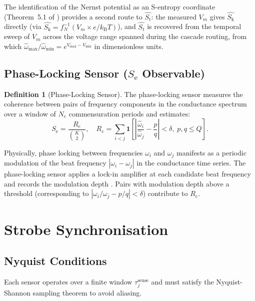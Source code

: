 \documentclass[11pt,twocolumn,a4paper]{article}
\theoremstyle{definition}
\newtheorem{definition}[theorem]{Definition}
\theoremstyle{remark}
\newcommand{\kB}{k_{\mathrm{B}}}
\newcommand{\Sk}{S_{\mathrm{k}}}
\newcommand{\St}{S_{\mathrm{t}}}
\newcommand{\Se}{S_{\mathrm{e}}}
\begin{document}
The identification of the Nernst potential as an S-entropy coordinate
(Theorem~5.1 of \citep{companion4}) provides a second route to $\hat{\St}$:
the measured $V_m$ gives $\hat{\Sk}$ directly (via $\hat{\Sk} = f_N^{-1}(V_m
\times e/\kB T)$), and $\hat{\St}$ is recovered from the temporal sweep of
$V_m$ across the voltage range spanned during the cascade routing, from which
$\hat{\omega}_{\max} / \hat{\omega}_{\min} = e^{V_{\max} - V_{\min}}$ in dimensionless units.

\subsection{Phase-Locking Sensor ($\Se$ Observable)}

\begin{definition}[Phase-Locking Sensor]
\label{def:phasesensor}
The phase-locking sensor measures the coherence between pairs of frequency
components in the conductance spectrum over a window of $N_e$ commensuration
periods and estimates:
\begin{equation}
\hat{\Se} = \frac{R_e}{\binom{K}{2}},
\quad R_e = \sum_{i < j} \mathbf{1}\!\left[\left|\frac{\hat{\omega}_i}{\hat{\omega}_j}
- \frac{p}{q}\right| < \delta,\; p, q \leq Q\right].
\label{eq:phaseest}
\end{equation}
\end{definition}

Physically, phase locking between frequencies $\omega_i$ and $\omega_j$ manifests
as a periodic modulation of the beat frequency $|\omega_i - \omega_j|$ in the
conductance time series. The phase-locking sensor applies a lock-in amplifier
at each candidate beat frequency and records the modulation depth
\citep{scofield1994}. Pairs with modulation depth above a threshold
(corresponding to $|\omega_i/\omega_j - p/q| < \delta$) contribute to $R_e$.

\section{Strobe Synchronisation}
\label{sec:strobe}

\subsection{Nyquist Conditions}

Each sensor operates over a finite window $\tau_j^{\mathrm{sense}}$ and must
satisfy the Nyquist-Shannon sampling theorem \citep{shannon1949} to avoid
aliasing.
\end{document}
